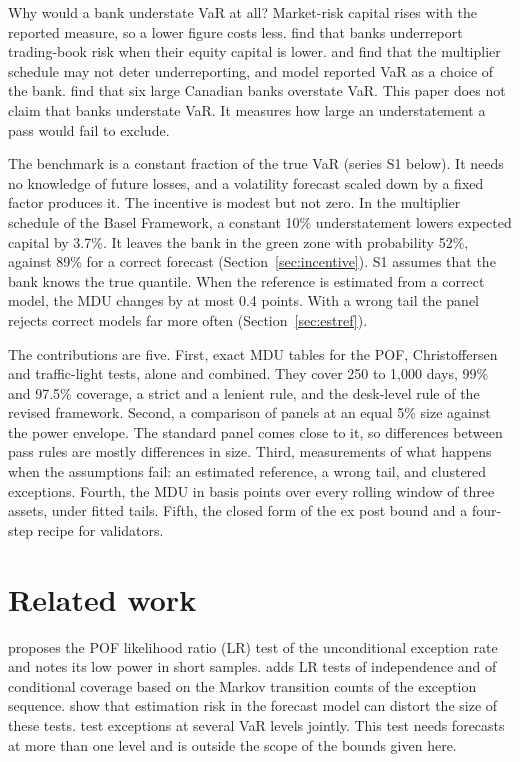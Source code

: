 \documentclass[11pt]{article}
\begin{document}
Why would a bank understate VaR at all? Market-risk capital rises with the
reported measure, so a lower figure costs less. \citet{begley2017} find that
banks underreport trading-book risk when their equity capital is lower.
\citet{lucas2001} and \citet{daveiga2012} find that the multiplier schedule may
not deter underreporting, and \citet{cuoco2006} model reported VaR as a choice
of the bank. \citet{perignon2008} find that six large Canadian banks overstate
VaR. This paper does not claim that banks understate VaR. It measures how large
an understatement a pass would fail to exclude.

The benchmark is a constant fraction of the true VaR (series S1 below). It
needs no knowledge of future losses, and a volatility forecast scaled down by a
fixed factor produces it. The incentive is modest but not zero. In the
multiplier schedule of the Basel Framework, a constant 10\% understatement
lowers expected capital by 3.7\%. It leaves the bank in the green zone with
probability 52\%, against 89\% for a correct forecast
(Section~\ref{sec:incentive}). S1 assumes that the bank knows the true
quantile. When the reference is estimated from a correct model, the MDU changes
by at most 0.4 points. With a wrong tail the panel rejects correct models far
more often (Section~\ref{sec:estref}).

The contributions are five. First, exact MDU tables for the POF, Christoffersen
and traffic-light tests, alone and combined. They cover 250 to 1,000 days, 99\%
and 97.5\% coverage, a strict and a lenient rule, and the desk-level rule of
the revised framework. Second, a comparison of panels at an equal 5\% size against
the power envelope. The standard panel comes close to it, so differences between
pass rules are mostly differences in size. Third, measurements of what happens
when the assumptions fail: an estimated reference, a wrong tail, and clustered
exceptions. Fourth, the MDU in basis points over every rolling window of three
assets, under fitted tails. Fifth, the closed form of the ex post bound and a
four-step recipe for validators.

\section{Related work}
\label{sec:related}

\citet{kupiec1995} proposes the POF likelihood ratio (LR) test of the
unconditional exception rate and notes its low power in short samples.
\citet{christoffersen1998} adds LR tests of independence and of conditional
coverage based on the Markov transition counts of the exception sequence.
\citet{escanciano2010} show that estimation risk in the forecast model can
distort the size of these tests.
\citet{kratz2018} test exceptions at several VaR levels jointly. This test needs
forecasts at more than one level and is outside the scope of the bounds given
here.
\end{document}
